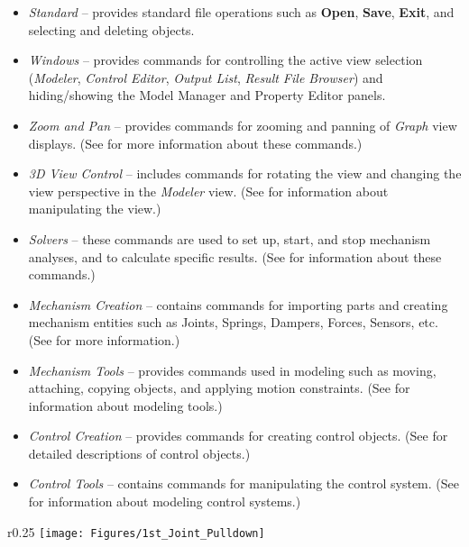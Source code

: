 \begin{itemize}
\item{\sl Standard} --
  provides standard file operations such as \textbf{Open}, \textbf{Save},
  \textbf{Exit}, and selecting and deleting objects.
\item{\sl Windows} --
  provides commands for controlling the active view selection
  ({\sl Modeler}, {\sl Control Editor}, {\sl Output List},
  {\sl Result File Browser})
  and hiding/showing the Model Manager and Property Editor panels.
\item{\sl Zoom and Pan} --
  provides commands for zooming and panning of {\sl Graph} view displays.
  (See  for more information
  about these commands.)
\item{\sl 3D View Control} --
  includes commands for rotating the view and changing the view perspective
  in the {\sl Modeler} view. (See 
  for information about manipulating the view.)
\item{\sl Solvers} --
  these commands are used to set up, start, and stop mechanism analyses,
  and to calculate specific results.
  (See  for information
  about these commands.)
\item{\sl Mechanism Creation} --
  contains commands for importing parts and creating mechanism entities
  such as Joints, Springs, Dampers, Forces, Sensors, etc.
  (See  for more information.)
\item{\sl Mechanism Tools} --
  provides commands used in modeling such as moving, attaching, copying objects,
  and applying motion constraints.
  (See 
  for information about modeling tools.)
\item{\sl Control Creation} --
  provides commands for creating control objects.
  (See 
  for detailed descriptions of control objects.)
\item{\sl Control Tools} --
  contains commands for manipulating the control system.
  (See 
  for information about modeling control systems.)
\end{itemize}


\begin{wrapfigure}[7]{r}{0.25\textwidth} \vskip-4mm
  \texttt{[image: Figures/1st\_Joint\_Pulldown]}
\end{wrapfigure}

